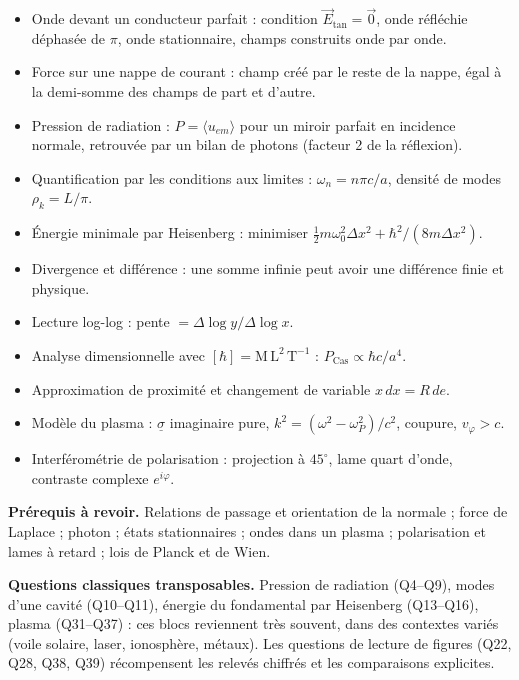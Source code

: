 \documentclass[11pt,a4paper]{article}
\providecommand{\tightlist}{\setlength{\itemsep}{0pt}\setlength{\parskip}{0pt}}
\begin{document}
\begin{itemize}
\tightlist
\item
  Onde devant un conducteur parfait : condition \(\vec E_{\mathrm{tan}}=\vec 0\), onde réfléchie déphasée de \(\pi\), onde stationnaire, champs construits onde par onde.
\item
  Force sur une nappe de courant : champ créé par le reste de la nappe, égal à la demi-somme des champs de part et d'autre.
\item
  Pression de radiation : \(P=\langle u_{em}\rangle\) pour un miroir parfait en incidence normale, retrouvée par un bilan de photons (facteur 2 de la réflexion).
\item
  Quantification par les conditions aux limites : \(\omega_n=n\pi c/a\), densité de modes \(\rho_k=L/\pi\).
\item
  Énergie minimale par Heisenberg : minimiser \(\frac12m\omega_0^2\Delta x^2+\hbar^2/(8m\Delta x^2)\).
\item
  Divergence et différence : une somme infinie peut avoir une différence finie et physique.
\item
  Lecture log-log : pente \(=\Delta\log y/\Delta\log x\).
\item
  Analyse dimensionnelle avec \([\hbar]=\mathrm{M\,L^2\,T^{-1}}\) : \(P_{\mathrm{Cas}}\propto\hbar c/a^4\).
\item
  Approximation de proximité et changement de variable \(x\,dx=R\,de\).
\item
  Modèle du plasma : \(\underline\sigma\) imaginaire pure, \(k^2=(\omega^2-\omega_P^2)/c^2\), coupure, \(v_\varphi>c\).
\item
  Interférométrie de polarisation : projection à \(45^\circ\), lame quart d'onde, contraste complexe \(e^{i\varphi}\).
\end{itemize}

\textbf{Prérequis à revoir.} Relations de passage et orientation de la normale ; force de Laplace ; photon ; états stationnaires ; ondes dans un plasma ; polarisation et lames à retard ; lois de Planck et de Wien.

\textbf{Questions classiques transposables.} Pression de radiation (Q4--Q9), modes d'une cavité (Q10--Q11), énergie du fondamental par Heisenberg (Q13--Q16), plasma (Q31--Q37) : ces blocs reviennent très souvent, dans des contextes variés (voile solaire, laser, ionosphère, métaux). Les questions de lecture de figures (Q22, Q28, Q38, Q39) récompensent les relevés chiffrés et les comparaisons explicites.
\end{document}
